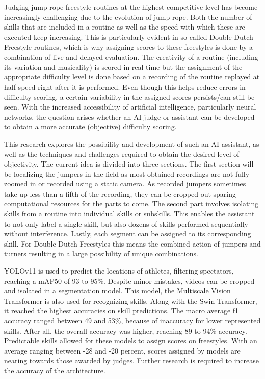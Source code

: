 
\chapter*{}

Judging jump rope freestyle routines at the highest competitive level has become increasingly challenging due to the evolution of jump rope. Both the number of skills that are included in a routine as well as the speed with which these are executed keep increasing. This is particularly evident in so-called Double Dutch Freestyle routines, which is why assigning scores to these freestyles is done by a combination of live and delayed evaluation. The creativity of a routine (including its variation and musicality) is scored in real time but the assignment of the appropriate difficulty level is done based on a recording of the routine replayed at half speed right after it is performed. Even though this helps reduce errors in difficulty scoring, a certain variability in the assigned scores persists/can still be seen. With the increased accessibility of artificial intelligence, particularly neural networks, the question arises whether an AI judge or assistant can be developed to obtain a more accurate (objective) difficulty scoring.

This research explores the possibility and development of such an AI assistant, as well as the techniques and challenges required to obtain the desired level of objectivity.
The current idea is divided into three sections. The first section will be localizing the jumpers in the field as most obtained recordings are not fully zoomed in or recorded using a static camera. As recorded jumpers sometimes take up less than a fifth of the recording, they can be cropped out sparing computational resources for the parts to come. The second part involves isolating skills from a routine into individual skills or subskills. This enables the assistant to not only label a single skill, but also dozens of skills performed sequentially without interference. Lastly, each segment can be assigned to its corresponding skill. For Double Dutch Freestyles this means the combined action of jumpers and turners resulting in a large possibility of unique combinations.

YOLOv11 is used to predict the locations of athletes, filtering spectators, reaching a mAP50 of 93 to 95\%. Despite minor mistakes, videos can be cropped and isolated in a segmentation model. This model, the Multiscale Vision Transformer is also used for recognizing skills. Along with the Swin Transformer, it reached the highest accuracies on skill predictions. The macro average f1 accuracy ranged between 49 and 53\%, because of inaccuracy for lower represented skills. After all, the overall accuracy was higher, reaching 89 to 94\% accuracy. Predictable skills allowed for these models to assign scores on freestyles. With an average ranging between -28 and -20 percent, scores assigned by models are nearing towards those awarded by judges.
Further research is required to increase the accuracy of the architecture. 
